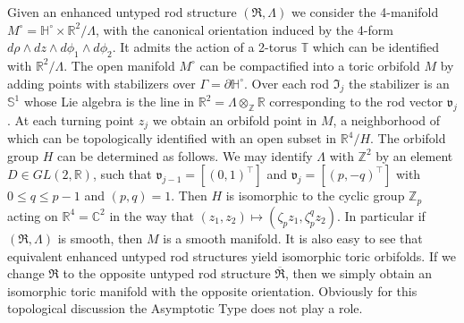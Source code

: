 \documentclass[a4paper,11pt]{amsart}
\theoremstyle{definition}
\numberwithin{equation}{section}
\newcommand{\p}{\partial}
\newcommand{\R}{\mathbb{R}}
\newcommand{\dS}{\mathbb{S}}
\newcommand{\mR} {\mathfrak R}
\begin{document}
Given an enhanced untyped rod structure $(\mathfrak{R}, \Lambda)$ we consider the  4-manifold $M^\circ=\mathbb H^\circ\times\mathbb{R}^2/\Lambda$, with the canonical orientation induced by the 4-form $d\rho\wedge dz\wedge d\phi_1\wedge d\phi_2$. It admits the action of a 2-torus $\mathbb T$ which can be identified with $\mathbb R^2/\Lambda$. The open manifold $M^\circ$ can be compactified into a toric orbifold $M$ by adding points with stabilizers over $\Gamma=\p\mathbb H^\circ$. Over each rod $\mathfrak I_j$ the stabilizer is an $\dS^1$ whose Lie algebra is the line in $\R^2=\Lambda\otimes _{\mathbb Z}\mathbb R$ corresponding to the rod vector $\mathfrak v_j$. At each turning point $z_j$ we obtain an orbifold point in $M$, a neighborhood of which can be topologically identified with an open subset in $\mathbb R^4/H$. The orbifold group $H$ can be determined as follows. We may identify $\Lambda$ with $\mathbb Z^2$ by an element $D\in GL(2,\mathbb{R})$, such that $\mathfrak v_{j-1}=[(0,1)^{\top}]$ and $\mathfrak v_j=[(p,-q)^{\top}]$ with $0\leq q\leq p-1$ and $(p, q)=1$. Then $H$ is isomorphic to the cyclic group $\mathbb{Z}_p$ acting on $\mathbb{R}^4=\mathbb{C}^2$ in the way that $(z_1,z_2)\mapsto (\zeta_{p}z_1,\zeta_p^q z_2)$. In particular if $(\mR, \Lambda)$ is smooth, then $M$ is a smooth manifold. It is also easy to see that equivalent enhanced untyped rod structures yield isomorphic toric orbifolds. If we change $\mR$ to the opposite untyped rod structure $\overline {\mR}$, then we simply obtain an isomorphic toric manifold with the opposite orientation.  Obviously for this topological discussion the  Asymptotic Type  does not play a role. 

 \

 
 
\end{document}
